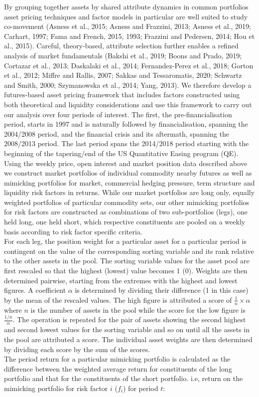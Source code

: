 \documentclass[]{elsarticle} %
\begin{document}
By grouping together assets by shared attribute dynamics in common portfolios asset pricing techniques and factor models in particular are well suited to study co-movement (Asness et al., 2015; Asness and Frazzini, 2013; Asness et al., 2019; Carhart, 1997; Fama and French, 2015, 1993; Frazzini and Pedersen, 2014; Hou et al., 2015). Careful, theory-based, attribute selection further enables a refined analysis of market fundamentals (Bakshi et al., 2019; Boons and Prado, 2019; Cortazar et al., 2013; Daskalaki et al., 2014; Fernandez-Perez et al., 2018; Gorton et al., 2012; Miffre and Rallis, 2007; Sakkas and Tessaromatis, 2020; Schwartz and Smith, 2000; Szymanowska et al., 2014; Yang, 2013). We therefore develop a futures-based asset pricing framework that includes factors constructed using both theoretical and liquidity considerations and use this framework to carry out our analysis over four periods of interest. The first, the pre-financialisation period, starts in 1997 and is naturally followed by financialisation, spanning the 2004/2008 period, and the financial crisis and its aftermath, spanning the 2008/2013 period. The last period spans the 2014/2018 period starting with the beginning of the tapering/end of the US Quantitative Easing program (QE).\\
Using the weekly price, open interest and market position data described above we construct market portfolios of individual commodity nearby futures as well as mimicking portfolios for market, commercial hedging pressure, term structure and liquidity risk factors in returns. While our market portfolios are long only, equally weighted portfolios of particular commodity sets, our other mimicking portfolios for risk factors are constructed as combinations of two sub-portfolios (legs), one held long, one held short, which respective constituents are pooled on a weekly basis according to risk factor specific criteria.\\
For each leg, the position weight for a particular asset for a particular period is contingent on the value of the corresponding sorting variable and its rank relative to the other assets in the pool. The sorting variable values for the asset pool are first rescaled so that the highest (lowest) value becomes 1 (0). Weights are then determined pairwise, starting from the extremes with the highest and lowest figures. A coefficient \(\alpha\) is determined by dividing their difference (1 in this case) by the mean of the rescaled values. The high figure is attributed a score of \(\frac{1}{n} \times \alpha\) where \(n\) is the number of assets in the pool while the score for the low figure is \(\frac{1/n}{\alpha}\). The operation is repeated for the pair of assets showing the second highest and second lowest values for the sorting variable and so on until all the assets in the pool are attributed a score. The individual asset weights are then determined by dividing each score by the sum of the scores.\\
The period return for a particular mimicking portfolio is calculated as the difference between the weighted average return for constituents of the long portfolio and that for the constituents of the short portfolio. i.e, return on the mimicking portfolio for risk factor \(i\) (\(f_{i}\)) for period \(t\):
\end{document}
